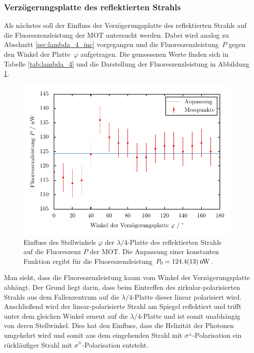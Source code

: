 \documentclass[11pt, a4paper]{article}
\numberwithin{equation}{section}
\begin{document}
\subsubsection{Verzögerungsplatte des reflektierten Strahls}
Als nächstes soll der Einfluss der Verzögerungsplatte des reflektierten Strahls auf die Fluoreszenzleistung der MOT untersucht werden.
Dabei wird analog zu Abschnitt \ref{sec:lambda_4_inc} vorgegangen und die Fluoreszenzleistung~$P$ gegen den Winkel der Platte~$\varphi$ aufgetragen.
Die gemessenen Werte finden sich in Tabelle \ref{tab:lambda_4} und die Darstellung der Fluoreszenzleistung in Abbildung \ref{fig:lambda_4_out}.
\begin{figure}[h]
	\centering
	\includegraphics{./figures/lambda_4_out.pdf}
	\caption{Einfluss des Stellwinkels $\varphi$ der $\lambda / 4$-Platte des reflektierten Strahls auf die Fluoreszenz $P$ der MOT. Die Anpassung einer konstanten Funktion ergibt für die Fluoreszenzleistung $P_0 = \SI{124.4 +- 1.3}{nW}$.}
	\label{fig:lambda_4_out}
\end{figure}

Man sieht, dass die Fluoreszenzleistung kaum vom Winkel der Verzögerungsplatte abhängt.
Der Grund liegt darin, dass beim Eintreffen des zirkular-polarisierten Strahls aus dem Fallenzentrum auf die $\lambda / 4$-Platte dieser linear polarisiert wird.
Anschließend wird der linear-polarisierte Strahl am Spiegel reflektiert und trifft unter dem gleichen Winkel erneut auf die $\lambda / 4$-Platte und ist somit unabhängig von deren Stellwinkel.
Dies hat den Einfluss, dass die Helizität der Photonen umgekehrt wird und somit aus dem eingehenden Strahl mit $\sigma^\pm$-Polarisation ein rückläufiger Strahl mit $\sigma^\mp$-Polarisation entsteht.
\end{document}
